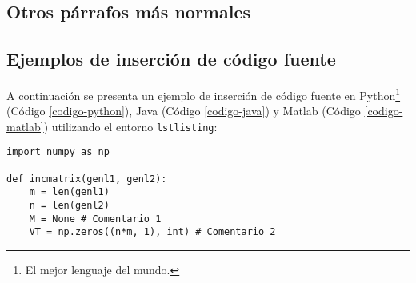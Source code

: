		\lipsum[115]
		
		\newp \lipsum[4]
		
	\subsection{Otros párrafos más normales}
	
		\lipsum[7]
		
		\newp \lipsum[2]
		
	
		\lipsum[4]
		
		\begin{multicols}{2}
			
			\lipsum[4]
			
			
			\lipsum[1]
			
		\end{multicols}
		
	\subsection{Ejemplos de inserción de código fuente}
		
		A continuación se presenta un ejemplo de inserción de código fuente en Python\footnote{El mejor lenguaje del mundo.} (Código \ref{codigo-python}), Java (Código \ref{codigo-java}) y Matlab (Código \ref{codigo-matlab}) utilizando el entorno \texttt{lstlisting}:
		
\begin{lstlisting}[style=Python, caption={Ejemplo en Python.\label{codigo-python}}]
import numpy as np

def incmatrix(genl1, genl2):
	m = len(genl1)
	n = len(genl2)
	M = None # Comentario 1
	VT = np.zeros((n*m, 1), int) # Comentario 2
\end{lstlisting}

